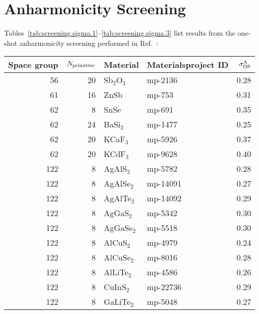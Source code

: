\chapter{Anharmonicity Screening}
\label{sec:app.screening}

Tables~\ref{tab:screening.sigma.1}--\ref{tab:screening.sigma.3} list results from the one-shot anharmonicity screening performed in Ref.~\cite{Knoop.2020}:

\begin{table*}[h!]
\small
  \begin{center}
\begin{tabular}{rrllr}
\toprule
 Space group &  $N_{\rm primitive}$ & Material & Materialsproject ID &  $\sigma^\mathrm{A}_\mathrm{OS}$ \\
\midrule
          56 &           20 &  Sb$_2$O$_3$ &    mp-2136 &       0.28 \\
          61 &           16 &         ZnSb &     mp-753 &       0.31 \\
          62 &            8 &         SnSe &     mp-691 &       0.35 \\
          62 &           24 &     BaSi$_2$ &    mp-1477 &       0.25 \\
          62 &           20 &     KCaF$_3$ &    mp-5926 &       0.37 \\
          62 &           20 &     KCdF$_3$ &    mp-9628 &       0.40 \\
         122 &            8 &    AgAlS$_2$ &    mp-5782 &       0.28 \\
         122 &            8 &   AgAlSe$_2$ &   mp-14091 &       0.27 \\
         122 &            8 &   AgAlTe$_2$ &   mp-14092 &       0.29 \\
         122 &            8 &    AgGaS$_2$ &    mp-5342 &       0.30 \\
         122 &            8 &   AgGaSe$_2$ &    mp-5518 &       0.30 \\
         122 &            8 &    AlCuS$_2$ &    mp-4979 &       0.24 \\
         122 &            8 &   AlCuSe$_2$ &    mp-8016 &       0.28 \\
         122 &            8 &   AlLiTe$_2$ &    mp-4586 &       0.26 \\
         122 &            8 &    CuInS$_2$ &   mp-22736 &       0.29 \\
         122 &            8 &   GaLiTe$_2$ &    mp-5048 &       0.27 \\

\end{tabular}
\end{center}
\end{table*}
